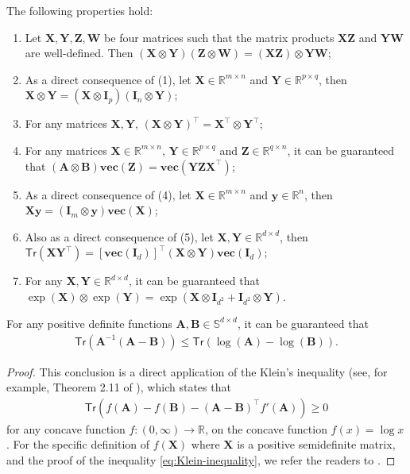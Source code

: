 \begin{customtheorem}\label{thm:Kronecker}
The following properties hold:
\begin{enumerate}[label={(\arabic*)}]
\item Let $\bm{X},\bm{Y},\bm{Z},\bm{W}$ be four matrices such that the matrix products $\bm{XZ}$ and $\bm{YW}$ are well-defined. Then $(\bm{X} \otimes \bm{Y})(\bm{Z}\otimes \bm{W}) = (\bm{XZ}) \otimes \bm{YW}$;
\item As a direct consequence of (1), let $\bm{X} \in \mathbb{R}^{m \times n}$ and $\bm{Y} \in \mathbb{R}^{p \times q}$, then $\bm{X} \otimes \bm{Y} = (\bm{X} \otimes \bm{I}_p)(\bm{I}_n \otimes \bm{Y})$; 
\item For any matrices $\bm{X},\bm{Y}$, $(\bm{X} \otimes \bm{Y})^\top = \bm{X}^\top \otimes \bm{Y}^\top$;
\item For any matrices $\bm{X} \in \mathbb{R}^{m \times n}$, $\bm{Y} \in \mathbb{R}^{p \times q}$ and $\bm{Z} \in \mathbb{R}^{q \times n}$, it can be guaranteed that $(\bm{A} \otimes \bm{B})\textbf{vec}(\bm{Z}) = \textbf{vec}(\bm{Y}\bm{Z}\bm{X}^\top)$;
\item As a direct consequence of (4), let $\bm{X} \in \mathbb{R}^{m \times n}$ and $\bm{y} \in \mathbb{R}^n$, then $\bm{Xy} = (\bm{I}_m \otimes \bm{y})\textbf{vec}(\bm{X})$;
\item Also as a direct consequence of (5), let $\bm{X},\bm{Y} \in \mathbb{R}^{d \times d}$, then $\mathsf{Tr}(\bm{XY}^\top) = [\mathbf{vec}(\bm{I}_d)]^\top (\bm{X} \otimes \bm{Y}) \mathbf{vec}(\bm{I}_d)$;
\item For any $\bm{X},\bm{Y} \in \mathbb{R}^{d \times d}$, it can be guaranteed that $\exp(\bm{X}) \otimes \exp(\bm{Y}) = \exp(\bm{X} \otimes \bm{I}_{d^2} + \bm{I}_{d^2} \otimes \bm{Y})$.
\end{enumerate}
\end{customtheorem}
\begin{customtheorem}\label{thm:Klein}
For any positive definite functions $\bm{A},\bm{B} \in \mathbb{S}^{d \times d}$, it can be guaranteed that
\begin{align*}
\mathsf{Tr}(\bm{A}^{-1}(\bm{A}-\bm{B})) \leq \mathsf{Tr}(\log(\bm{A}) -\log(\bm{B})).
\end{align*}
\end{customtheorem}

\begin{proof}
This conclusion is a direct application of the Klein's inequality (see, for example, Theorem 2.11 of \cite{Carlen2009TRACEIA}), which states that 
\begin{align}\label{eq:Klein-inequality}
\mathsf{Tr}(f(\bm{A})-f(\bm{B})-(\bm{A} - \bm{B})^\top f'(\bm{A})) \geq 0
\end{align}
for any concave function $f: (0,\infty) \to \mathbb{R}$, on the concave function $f(x) = \log x$. For the specific definition of $f(\bm{X})$ where $\bm{X}$ is a positive semidefinite matrix, and the proof of the inequality \eqref{eq:Klein-inequality}, we refer the readers to \cite{Carlen2009TRACEIA}.
\end{proof}

